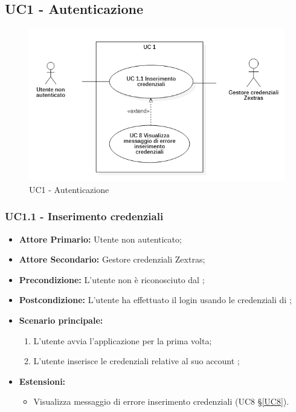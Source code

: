 \subsection{UC1 - Autenticazione}
\begin{figure}[H]
    \centering
    \includegraphics[scale = 0.7]{components/img/UC1.png}
    \caption{UC1 - Autenticazione}
\end{figure}
\subsubsection{UC1.1 - Inserimento credenziali}
\begin{itemize}
\item \textbf{Attore Primario:} Utente non autenticato;
\item \textbf{Attore Secondario:} Gestore credenziali Zextras;
\item \textbf{Precondizione:} L'utente non è riconosciuto dal ;
\item \textbf{Postcondizione:} L'utente ha effettuato il login usando le credenziali di ;
\item \textbf{Scenario principale:}
    \begin{enumerate}
    \item L'utente avvia l'applicazione per la prima volta;
    \item L'utente inserisce le credenziali relative al suo account ;
    \end{enumerate}
\item \textbf{Estensioni:}
\begin{itemize}
\item Visualizza messaggio di errore inserimento credenziali (UC8 \S{}\ref{UC8}).
\end{itemize}
\end{itemize}
